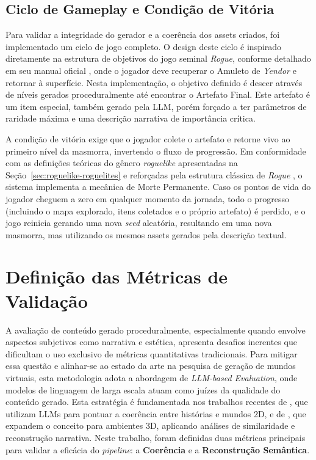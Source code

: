 \subsection{Ciclo de Gameplay e Condição de Vitória}

Para validar a integridade do gerador e a coerência dos assets criados, foi
implementado um ciclo de jogo completo. O design deste ciclo é inspirado
diretamente na estrutura de objetivos do jogo seminal \textit{Rogue}, conforme
detalhado em seu manual oficial \cite{epyx1985rogue}, onde o jogador deve
recuperar o Amuleto de \textit{Yendor} e retornar à superfície.  Nesta
implementação, o objetivo definido é descer através de níveis gerados
proceduralmente até encontrar o Artefato Final. Este artefato é um item
especial, também gerado pela \gls{LLM}, porém forçado a ter parâmetros de
raridade máxima e uma descrição narrativa de importância crítica.

A condição de vitória exige que o jogador colete o artefato e retorne vivo ao
primeiro nível da masmorra, invertendo o fluxo de progressão. Em conformidade
com as definições teóricas do gênero \textit{roguelike} apresentadas na
Seção~\ref{sec:roguelike-roguelites} e reforçadas pela estrutura clássica de
\textit{Rogue} \cite{epyx1985rogue}, o sistema implementa a mecânica de Morte
Permanente.  Caso os pontos de vida do jogador cheguem a zero em qualquer
momento da jornada, todo o progresso (incluindo o mapa explorado, itens
coletados e o próprio artefato) é perdido, e o jogo reinicia gerando uma nova
\textit{seed} aleatória, resultando em uma nova masmorra, mas utilizando os
mesmos assets gerados pela descrição textual.


\section{Definição das Métricas de Validação}

A avaliação de conteúdo gerado proceduralmente, especialmente quando envolve
aspectos subjetivos como narrativa e estética, apresenta desafios inerentes que
dificultam o uso exclusivo de métricas quantitativas tradicionais. Para mitigar
essa questão e alinhar-se ao estado da arte na pesquisa de geração de mundos
virtuais, esta metodologia adota a abordagem de \textit{LLM-based Evaluation},
onde modelos de linguagem de larga escala atuam como juízes da qualidade do
conteúdo gerado. Esta estratégia é fundamentada nos trabalhos recentes de
\citeauthor{nasir2024word2world}, que utilizam \gls{LLM}s para pontuar a
coerência entre histórias e mundos 2D, e de
\citeauthor{huang2025word2minecraft}, que expandem o conceito para ambientes 3D,
aplicando análises de similaridade e reconstrução narrativa. Neste trabalho,
foram definidas duas métricas principais para validar a eficácia do
\textit{pipeline}: a \textbf{Coerência} e a \textbf{Reconstrução Semântica}.

